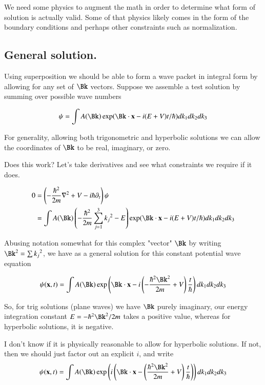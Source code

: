 \documentclass{article}
\begin{document}
We need some physics
to augment the math in order to determine what form of solution is actually valid.  Some of that physics likely comes in the form of the boundary conditions and perhaps other constraints such as normalization.

\subsection{ General solution. }

Using superposition we should be able to form a wave packet in integral form
by allowing for any set of $\Bk$ vectors.  Suppose we assemble a test solution by summing over possible wave numbers

\begin{align*}
\psi = \int A(\Bk) \exp(\Bk \cdot \Bx - i(E + V) t/\hbar) dk_1 dk_2 dk_3 \\
\end{align*}

For generality, allowing both trigonometric and hyperbolic solutions we can
allow the coordinates of $\Bk$ to be real, imaginary, or zero.

Does this work?  Let's take derivatives and see what constraints we require if it does.

\begin{align*}
0 
&= \left(-\frac{\hbar^2}{2m}\grad^2 + V -i\hbar \partial_t\right)\psi \\
&= \int A(\Bk) \left(-\frac{\hbar^2}{2m}\sum_{j=1}^3 {k_j}^2 - E\right) \exp(\Bk \cdot \Bx - i(E + V) t/\hbar) dk_1 dk_2 dk_3 \\
\end{align*}

Abusing notation somewhat for this complex "vector" $\Bk$ by writing $\Bk^2 = \sum {k_j}^2$, we have
as a general solution for this constant potential wave equation

\begin{align*}
\psi(\Bx,t) = \int A(\Bk) \exp\left(\Bk \cdot \Bx - i\left(-\frac{\hbar^2 \Bk^2}{2m} + V\right) \frac{t}{\hbar}\right) dk_1 dk_2 dk_3 \\
\end{align*}

So, for trig solutions (plane waves) we have $\Bk$ purely imaginary, our energy integration constant $E = -\hbar^2\Bk^2/2m$ takes a positive value, whereas for hyperbolic solutions, it is negative.

I don't know if it is physically reasonable to allow for hyperbolic solutions.  If not, then we should just
factor out an explicit $i$, and write
\begin{align*}
\psi(\Bx,t) = \int A(\Bk) \exp\left(i \left(\Bk \cdot \Bx - \left(\frac{\hbar^2 \Bk^2}{2m} + V\right) \frac{t}{\hbar}\right)\right) dk_1 dk_2 dk_3 \\
\end{align*}
\end{document}
